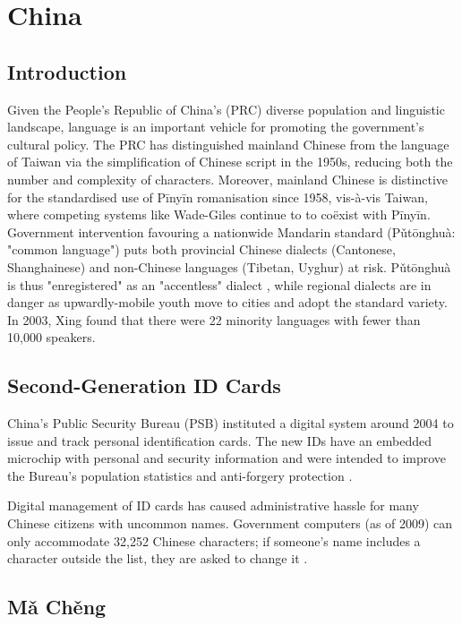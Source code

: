 \section{China}

\subsection{Introduction}

Given the People's Republic of China's (PRC) diverse population and linguistic
landscape, language is an important vehicle for promoting the government's
cultural policy. The PRC has distinguished mainland Chinese from the language of
Taiwan via the simplification of Chinese script in the 1950s, reducing both the
number and complexity of characters. Moreover, mainland Chinese is distinctive
for the standardised use of Pīnyīn romanisation since 1958, vis-à-vis Taiwan,
where competing systems like Wade-Giles continue to to coëxist with Pīnyīn.
Government intervention favouring a nationwide Mandarin standard (Pǔtōnghuà:
"common language") puts both provincial Chinese dialects (Cantonese,
Shanghainese) and non-Chinese languages (Tibetan, Uyghur) at risk. Pǔtōnghuà is
thus "enregistered" as an "accentless" dialect \parencite{dong10}, while
regional dialects are in danger as upwardly-mobile youth move to cities and
adopt the standard variety. In 2003, Xing found that there were 22 minority
languages with fewer than 10,000 speakers.

\subsection{Second-Generation ID Cards}

China's Public Security Bureau (PSB) instituted a digital system around 2004 to
issue and track personal identification cards. The new IDs have an embedded
microchip with personal and security information and were intended to improve
the Bureau's population statistics and anti-forgery protection
\parencite{ciicn04}.

Digital management of ID cards has caused administrative hassle for many Chinese
citizens with uncommon names. Government computers (as of 2009) can only
accommodate 32,252 Chinese characters; if someone's name includes a character
outside the list, they are asked to change it \parencite{lafraniere09}.

\subsection{Mǎ Chěng}


